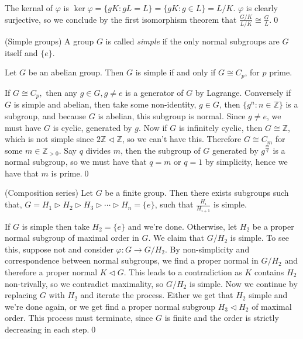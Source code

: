 \documentclass{article}
\newcommand{\nrm}{\triangleleft}
\begin{document}
The kernal of $ \varphi $ is $ \ker \varphi = \{gK:gL=L\} =\{gK: g\in L\} = L/K $. $ \varphi $ is clearly surjective, so we conclude by the first isomorphism theorem that $ \frac{G/K}{L/K}\cong \frac GL $.\qed
\begin{definition}
	(Simple groups) A group $ G $ is called \textit{simple} if the only normal subgroups are $ G $ itself and $ \{ e \} $.
\end{definition}
\begin{proposition}
  Let $ G $ be an abelian group. Then $ G $ is simple if and only if  $ G\cong C_p $, for $ p $ prime.
\end{proposition}
\pf If $ G\cong C_p, $ then any $ g\in G, g\ne e $ is a generator of $ G $ by Lagrange. Conversely if $ G $ is simple and abelian, then take some non-identity, $ g\in G $, then $ \{g^n :n\in \mathbb Z\} $ is a subgroup, and because $ G $ is abelian, this subgroup is normal. Since $ g\ne e $, we must have $ G $ is cyclic, generated by $ g $. Now if $ G $ is infinitely cyclic, then $ G\cong\mathbb Z $, which is not simple since $ 2\mathbb Z\nrm \mathbb Z $, so we can't have this. Therefore $ G\cong C_m $ for some $ m\in \mathbb Z_{>0} $. Say $ q $ divides $ m $, then the subgroup of $ G $ generated by $ g^{\frac mq} $ is a normal subgroup, so we must have that $ q=m $ or $ q=1 $ by simplicity, hence we have that $ m $ is prime.\qed
\begin{theorem}
	(Composition series) Let $ G $ be a finite group. Then there exists subgroups such that, $ G=H_1\triangleright H_2\triangleright H_3\triangleright\cdots \triangleright H_n=\{e\} $, such that $ \frac {H_i}{H_{i+1}} $ is simple.
\end{theorem}
\pf If $ G $ is simple then take $ H_2=\{e\} $ and we're done. Otherwise, let $ H_2 $ be a proper normal subgroup of maximal order in $ G $. We claim that $ G/H_2 $ is simple. To see this, suppose not and consider $ \varphi: G\to G/H_2 $.
 By non-simplicity and correspondence between normal subgroups, we find a proper normal in $ G/H_2 $ and therefore a proper normal $ K\nrm G $. This leads to a contradiction as $ K $ contains $ H_2 $ non-trivally, so we contradict maximality, so $ G/H_2 $ is simple. Now we continue by replacing $ G $ with $ H_2 $ and iterate the process. Either we get that $ H_2 $ simple and we're done again, or we get find a proper normal subgroup $ H_3\nrm H_2 $ of maximal order. This process must terminate, since $ G $ is finite and the order is strictly decreasing in each step.\qed
\end{document}
